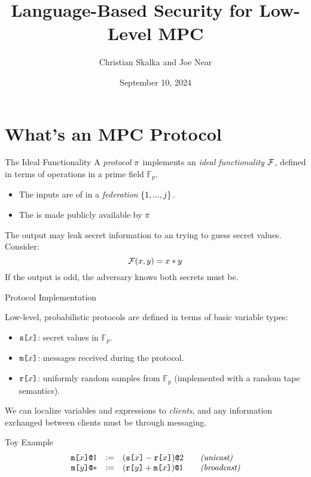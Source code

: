 \documentclass{beamer}
\title{Language-Based Security for Low-Level MPC}
\author{Christian Skalka and Joe Near}
\date{September 10, 2024}
\begin{document}
\begin{frame}
    \titlepage 
\end{frame}

\logo{}



\section{What's an MPC Protocol}

\begin{frame}{The Ideal Functionality}
  A \emph{protocol} $\pi$ implements an \emph{ideal functionality} $\mathcal{F}$,
  defined in terms of operations in a prime field $\mathbb{F}_p$.
  \begin{itemize}
  \item The inputs are  of  in a \emph{federation}
    $\{ 1,...,j \}$.
  \item The  is made publicly available by $\pi$
  \end{itemize}
  The output may leak secret information to an  trying to
  guess secret values.  Consider:
  $$
  \mathcal{F}(x,y) = x * y
  $$
  If the output is odd, the adversary knows both secrets must be.  
\end{frame}
 
\begin{frame}{Protocol Implementation}

  Low-level, probabilistic protocols are defined in terms of basic variable types:
  \begin{itemize}
  \item $\texttt{s[}x\texttt{]}$: secret values in $\mathbb{F}_p$.
  \item $\texttt{m[}x\texttt{]}$: messages received during the protocol.
  \item $\texttt{r[}x\texttt{]}$: uniformly random samples from $\mathbb{F}_p$ (implemented with
    a random tape semantics).
  \end{itemize}
  We can localize variables and expressions to \emph{clients}, and any information
  exchanged between clients must be through messaging.
  \begin{exampleblock}{Toy Example}
    $$
    \begin{array}{rcl@{\qquad}l}
      \mx{x}{1} &:=& \elab{(\secret{x} - \flip{x})}{2}  & \textit{(unicast)}\\
      \mx{y}{*} &:=& \elab{(\flip{y} + \mesg{x})}{1}  & \textit{(broadcast)}
    \end{array}
    $$ 
  \end{exampleblock}
\end{frame}
\end{document}
